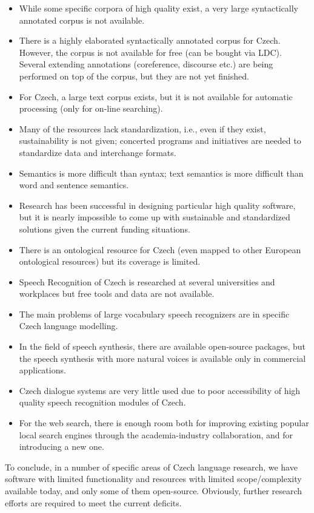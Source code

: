 \begin{multicols}{2}
\begin{itemize}
\item While some specific corpora of high quality exist, a very large syntactically annotated corpus is not available.
\item There is a highly elaborated syntactically annotated corpus for Czech. However, the corpus is not available for free (can be bought via LDC). Several extending annotations (coreference, discourse etc.) are being performed on top of the corpus, but they are not yet finished.
\item For Czech, a large text corpus exists, but it is not available for automatic processing (only for on-line searching).
\item Many of the resources lack standardization, i.e., even if they exist, sustainability is not given; concerted programs and initiatives are needed to standardize data and interchange formats.
\item Semantics is more difficult than syntax; text semantics is more difficult than word and sentence semantics.
\item Research has been successful in designing particular high quality software, but it is nearly impossible to come up with sustainable and standardized solutions given the current funding situations.
\item There is an ontological resource for Czech (even mapped to other European ontological resources) but its coverage is limited.
\item Speech Recognition of Czech is researched at several universities and workplaces but free tools and data are not available.
\item The main problems of large vocabulary speech recognizers are in specific Czech language modelling.
\item In the field of speech synthesis, there are available open-source packages, but the speech synthesis with more natural voices is available only in commercial applications.
\item Czech dialogue systems are very little used due to poor accessibility of high quality speech recognition modules of Czech.
\item For the web search, there is enough room both for improving existing popular local search engines through the academia-industry collaboration, and for introducing a new one.
\end{itemize}
To conclude, in a number of specific areas of Czech language research, we have software with limited functionality and resources with limited scope/complexity available today, and only some of them open-source. Obviously, further research efforts are required to meet the current deficits.


\end{multicols}
